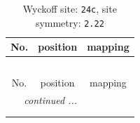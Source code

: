 \documentclass[fleqn,8pt]{jsarticle}
\begin{document}
\renewcommand{\arraystretch}{1.2}
\begin{longtable}{ccc}
\caption{Wyckoff site: {\tt 24c}, site symmetry: {\tt 2.22}}
 \\
 \hline \hline
No. & position & mapping \\ \hline \endfirsthead

\multicolumn{2}{l}{\tablename\ \thetable{}} \\
 \hline \hline
No. & position & mapping \\ \hline \endhead

 \hline \hline
\multicolumn{2}{r}{\footnotesize\it continued ...} \\ \endfoot

 \hline \hline
\multicolumn{2}{r}{} \\ \endlastfoot


\end{longtable}
\end{document}
